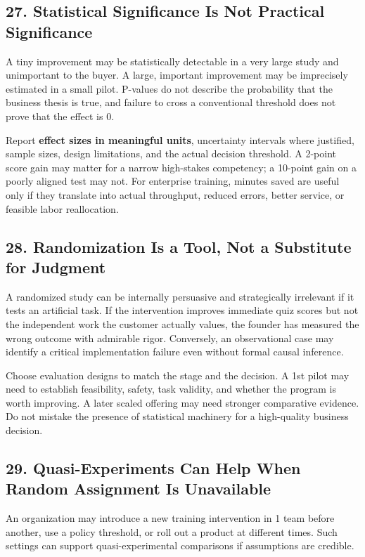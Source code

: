\subsection*{27. Statistical Significance Is Not Practical Significance}

A tiny improvement may be statistically detectable in a very large study and unimportant to the buyer. A large, important improvement may be imprecisely estimated in a small pilot. P-values do not describe the probability that the business thesis is true, and failure to cross a conventional threshold does not prove that the effect is 0.

Report \textbf{effect sizes in meaningful units}, uncertainty intervals where justified, sample sizes, design limitations, and the actual decision threshold. A 2-point score gain may matter for a narrow high-stakes competency; a 10-point gain on a poorly aligned test may not. For enterprise training, minutes saved are useful only if they translate into actual throughput, reduced errors, better service, or feasible labor reallocation.

\subsection*{28. Randomization Is a Tool, Not a Substitute for Judgment}

A randomized study can be internally persuasive and strategically irrelevant if it tests an artificial task. If the intervention improves immediate quiz scores but not the independent work the customer actually values, the founder has measured the wrong outcome with admirable rigor. Conversely, an observational case may identify a critical implementation failure even without formal causal inference.

Choose evaluation designs to match the stage and the decision. A 1st pilot may need to establish feasibility, safety, task validity, and whether the program is worth improving. A later scaled offering may need stronger comparative evidence. Do not mistake the presence of statistical machinery for a high-quality business decision.

\subsection*{29. Quasi-Experiments Can Help When Random Assignment Is Unavailable}

An organization may introduce a new training intervention in 1 team before another, use a policy threshold, or roll out a product at different times. Such settings can support quasi-experimental comparisons if assumptions are credible.

